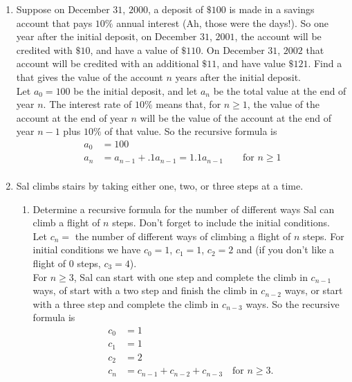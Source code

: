 \documentclass[11pt]{amsart}
\begin{document}
\begin{enumerate}

\item     Suppose on December $31$, $2000$, a deposit of $\$100$ is made in a savings 
account that pays $10\%$ annual interest (Ah, those were the days!). 
So one year after the initial deposit, on  December $31$, $2001$, the account
will be credited with $\$10$, and have a value of $\$110$. On  December $31$, $2002$
that account will be credited with an additional $\$11$, and have value $\$121$.
Find a  that gives the value of the account $n$ years after the
initial deposit.\\[3pt]

{\color{blue}
Let $a_0 = 100$ be the initial deposit, and let $a_n$ be the total value at the end of year $n$. The interest rate of $10\%$ means that,
for $n\geq 1$, 
the value of the account at the end of year $n$ will be the value of the account at the end  of
year $n-1$ plus $10\%$ of that value. So  the recursive formula is
\begin{align*}
a_0 &= 100\\
a_n &= a_{n-1} + .1a_{n-1} = 1.1a_{n-1}\qquad\text{for } n\geq 1\\[5pt]
\end{align*}
} 

\item Sal climbs stairs by taking either one, two, or three steps at a time.\\[3pt]
  \begin{enumerate}
\item Determine a recursive formula for the number of different ways Sal can climb a
flight of $n$ steps. Don't forget to include the initial conditions. \\[3pt]

{\color{blue}
Let $c_n = $ the number of different ways of climbing a flight of $n$ steps. For initial conditions we have
$c_0 = 1$, $c_1 = 1$, $c_2 = 2$ and (if you don't like a flight of $0$ steps, $c_3 = 4$).\\
For $n\geq 3$, Sal can start with one step and complete the climb in $c_{n-1}$ ways, of start with a two step and finish 
the climb in $c_{n-2}$ ways, or start with a three step and complete the climb in $c_{n-3}$ ways.
So the recursive formula is
\begin{align*}
c_0 &= 1\\
c_1 &= 1\\
c_2 &= 2\\
c_n &= c_{n-1}+c_{n-2}+c_{n-3} \quad \text{for } n\geq 3.\\[3pt]
\end{align*}
}


\end{enumerate}
\end{enumerate}
\end{document}
